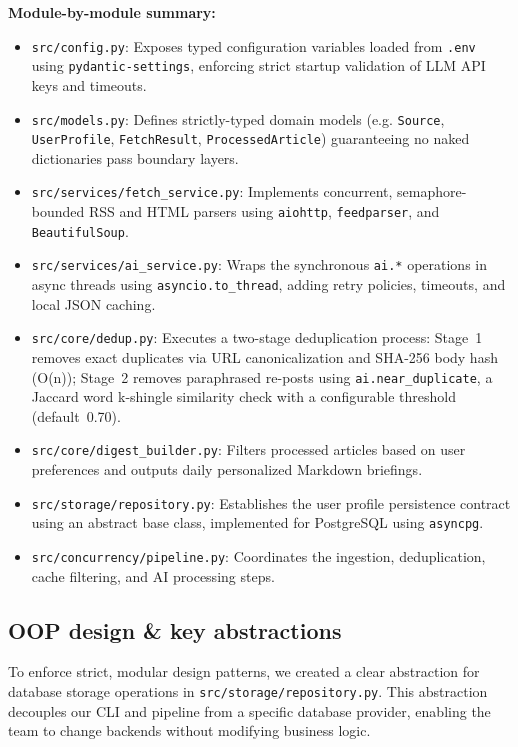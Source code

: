 \documentclass[11pt,a4paper]{article}
\begin{document}
\textbf{Module-by-module summary:}
\begin{itemize}
    \item \texttt{src/config.py}: Exposes typed configuration variables loaded from \texttt{.env} using \texttt{pydantic-settings}, enforcing strict startup validation of LLM API keys and timeouts.
    \item \texttt{src/models.py}: Defines strictly-typed domain models (e.g. \texttt{Source}, \texttt{UserProfile}, \texttt{FetchResult}, \texttt{ProcessedArticle}) guaranteeing no naked dictionaries pass boundary layers.
    \item \texttt{src/services/fetch\_service.py}: Implements concurrent, semaphore-bounded RSS and HTML parsers using \texttt{aiohttp}, \texttt{feedparser}, and \texttt{BeautifulSoup}.
    \item \texttt{src/services/ai\_service.py}: Wraps the synchronous \texttt{ai.*} operations in async threads using \texttt{asyncio.to\_thread}, adding retry policies, timeouts, and local JSON caching.
    \item \texttt{src/core/dedup.py}: Executes a two-stage deduplication process: Stage~1 removes exact duplicates via URL canonicalization and SHA-256 body hash (O(n)); Stage~2 removes paraphrased re-posts using \texttt{ai.near\_duplicate}, a Jaccard word k-shingle similarity check with a configurable threshold (default~0.70).
    \item \texttt{src/core/digest\_builder.py}: Filters processed articles based on user preferences and outputs daily personalized Markdown briefings.
    \item \texttt{src/storage/repository.py}: Establishes the user profile persistence contract using an abstract base class, implemented for PostgreSQL using \texttt{asyncpg}.
    \item \texttt{src/concurrency/pipeline.py}: Coordinates the ingestion, deduplication, cache filtering, and AI processing steps.
\end{itemize}

\subsection{OOP design \& key abstractions}

To enforce strict, modular design patterns, we created a clear abstraction for database storage operations in \texttt{src/storage/repository.py}. This abstraction decouples our CLI and pipeline from a specific database provider, enabling the team to change backends without modifying business logic.
\end{document}
